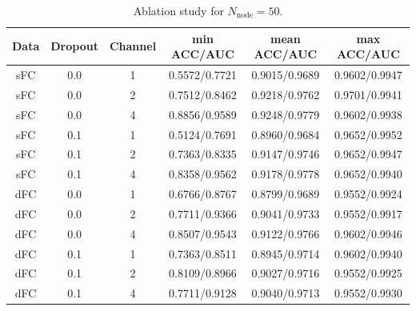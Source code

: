 \documentclass[11pt]{article}
\begin{document}
\begin{table}[H]
    \centering
    \begin{tabular}{|c|c|c|c|c|c|}
        \hline
        Data & Dropout & Channel & min ACC/AUC   & mean ACC/AUC  & max ACC/AUC   \\
        \hline
        sFC  & 0.0     & 1       & 0.5572/0.7721 & 0.9015/0.9689 & 0.9602/0.9947 \\
        \hline
        sFC  & 0.0     & 2       & 0.7512/0.8462 & 0.9218/0.9762 & 0.9701/0.9941 \\
        \hline
        sFC  & 0.0     & 4       & 0.8856/0.9589 & 0.9248/0.9779 & 0.9602/0.9938 \\
        \hline
        sFC  & 0.1     & 1       & 0.5124/0.7691 & 0.8960/0.9684 & 0.9652/0.9952 \\
        \hline
        sFC  & 0.1     & 2       & 0.7363/0.8335 & 0.9147/0.9746 & 0.9652/0.9947 \\
        \hline
        sFC  & 0.1     & 4       & 0.8358/0.9562 & 0.9178/0.9778 & 0.9652/0.9940 \\
        \hline
        dFC  & 0.0     & 1       & 0.6766/0.8767 & 0.8799/0.9689 & 0.9552/0.9924 \\
        \hline
        dFC  & 0.0     & 2       & 0.7711/0.9366 & 0.9041/0.9733 & 0.9552/0.9917 \\
        \hline
        dFC  & 0.0     & 4       & 0.8507/0.9543 & 0.9122/0.9766 & 0.9602/0.9946 \\
        \hline
        dFC  & 0.1     & 1       & 0.7363/0.8511 & 0.8945/0.9714 & 0.9602/0.9940 \\
        \hline
        dFC  & 0.1     & 2       & 0.8109/0.8966 & 0.9027/0.9716 & 0.9552/0.9925 \\
        \hline
        dFC  & 0.1     & 4       & 0.7711/0.9128 & 0.9040/0.9713 & 0.9552/0.9930 \\
        \hline
    \end{tabular}
    \caption{Ablation study for $N_{\text{node}} = 50$.}
\end{table}
\end{document}
